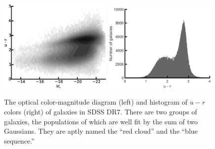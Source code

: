 \begin{figure}
    \includegraphics[width=0.49\textwidth]{Images/GV/ur_CMD_contour}
    \includegraphics[width=0.49\textwidth]{Images/GV/ur_hist}
    \caption[Optical color-magnitude diagram and histogram of $u-r$ in SDSS]{The 
    optical color-magnitude diagram (left) and histogram of $u-r$ colors (right) 
    of galaxies in SDSS DR7.  There are two groups of galaxies, the populations 
    of which are well fit by the sum of two Gaussians.  They are aptly named the 
    ``red cloud'' and the ``blue sequence.''}
    \label{fig:ur_CMD}
\end{figure}



